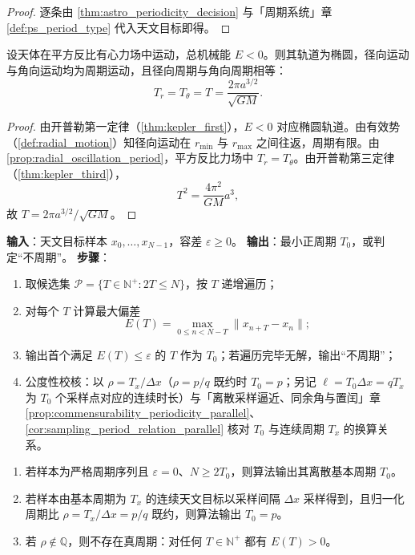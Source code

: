 \begin{proof}
逐条由 \cref{thm:astro_periodicity_decision} 与「周期系统」章 \cref{def:ps_period_type} 代入天文目标即得。
\end{proof}

\begin{lemma}[开普勒轨道的周期判定]\label{lem:kepler_period}
设天体在平方反比有心力场中运动，总机械能 \(E<0\)。则其轨道为椭圆，径向运动与角向运动均为周期运动，且径向周期与角向周期相等：
\[
T_r=T_\theta=T=\frac{2\pi a^{3/2}}{\sqrt{GM}}.
\]
\end{lemma}

\begin{proof}
由开普勒第一定律（\cref{thm:kepler_first}），\(E<0\) 对应椭圆轨道。由有效势（\cref{def:radial_motion}）知径向运动在 \(r_{\min}\) 与 \(r_{\max}\) 之间往返，周期有限。由 \cref{prop:radial_oscillation_period}，平方反比力场中 \(T_r=T_\theta\)。由开普勒第三定律（\cref{thm:kepler_third}），
\[
T^2=\frac{4\pi^2}{GM}a^3,
\]
故 \(T=2\pi a^{3/2}/\sqrt{GM}\)。
\end{proof}

\begin{definition}[天文最小正周期算法]\label{def:astro_minimal_period_algorithm}
\textbf{输入}：天文目标样本 \(x_0,\dots,x_{N-1}\)，容差 \(\varepsilon\ge0\)。
\textbf{输出}：最小正周期 \(T_0\)，或判定“不周期”。
\textbf{步骤}：
\begin{enumerate}[label=(\arabic*)]
    \item 取候选集 \(\mathcal P=\{T\in\mathbb N^+:2T\le N\}\)，按 \(T\) 递增遍历；
    \item 对每个 \(T\) 计算最大偏差
    \[
    E(T)=\max_{0\le n<N-T}\|x_{n+T}-x_n\|;
    \]
    \item 输出首个满足 \(E(T)\le\varepsilon\) 的 \(T\) 作为 \(T_0\)；若遍历完毕无解，输出“不周期”；
    \item 公度性校核：以 \(\rho=T_x/\Delta x\)（\(\rho=p/q\) 既约时 \(T_0=p\)；另记 \(\ell=T_0\Delta x=qT_x\) 为 \(T_0\) 个采样点对应的连续时长）与「离散采样逼近、同余角与置闰」章 \cref{prop:commensurability_periodicity_parallel}、\cref{cor:sampling_period_relation_parallel} 核对 \(T_0\) 与连续周期 \(T_x\) 的换算关系。
\end{enumerate}
\end{definition}

\begin{theorem}[天文最小正周期算法的正确性]\label{thm:astro_minimal_period_correctness}
\begin{enumerate}[label=(\roman*)]
    \item 若样本为严格周期序列且 \(\varepsilon=0\)、\(N\ge2T_0\)，则算法输出其离散基本周期 \(T_0\)。
    \item 若样本由基本周期为 \(T_x\) 的连续天文目标以采样间隔 \(\Delta x\) 采样得到，且归一化周期比 \(\rho=T_x/\Delta x=p/q\) 既约，则算法输出 \(T_0=p\)。
    \item 若 \(\rho\notin\mathbb Q\)，则不存在真周期：对任何 \(T\in\mathbb N^+\) 都有 \(E(T)>0\)。
\end{enumerate}
\end{theorem}

